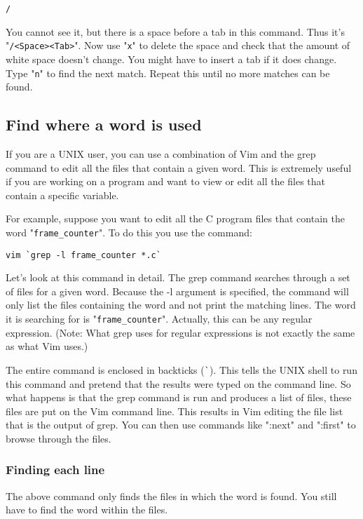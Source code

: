 \begin{Verbatim}[samepage=true]
 /   
\end{Verbatim}

You cannot see it, but there is a space before a tab in this command.
Thus it's "\verb!/<Space><Tab>!".
Now use "\verb!x!" to delete the space and check that the amount of white space doesn't change.
You might have to insert a tab if it does change.
Type "\verb!n!" to find the next match.
Repeat this until no more matches can be found.
\subsection{Find where a word is used}
If you are a UNIX user, you can use a combination of Vim and the grep command to edit all the files that contain a given word.
This is extremely useful if you are working on a program and want to view or edit all the files that contain a specific variable.

For example, suppose you want to edit all the C program files that contain the word "\verb!frame_counter!".
To do this you use the command:

\begin{Verbatim}[samepage=true]
 vim `grep -l frame_counter *.c`
\end{Verbatim}

Let's look at this command in detail.
The grep command searches through a set of files for a given word.
Because the -l argument is specified, the command will only list the files containing the word and not print the matching lines.
The word it is searching for is "\verb!frame_counter!".
Actually, this can be any regular expression.
(Note: What grep uses for regular expressions is not exactly the same as what Vim uses.)

The entire command is enclosed in backticks (\verb!`!).
This tells the UNIX shell to run this command and pretend that the results were typed on the command line.
So what happens is that the grep command is run and produces a list of files, these files are put on the Vim command line.
This results in Vim editing the file list that is the output of grep.
You can then use commands like ":next" and ":first" to browse through the files.

\subsubsection{Finding each line}
The above command only finds the files in which the word is found.
You still have to find the word within the files.

